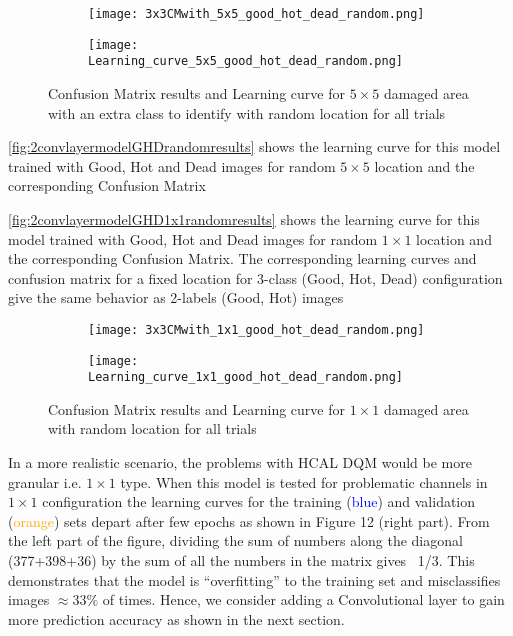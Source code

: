 \begin{figure}
	\begin{subfigure}{.5\textwidth}
 		\texttt{[image: 3x3CMwith\_5x5\_good\_hot\_dead\_random.png]}
 	\end{subfigure}
 	\begin{subfigure}{.45\textwidth}
 	\texttt{[image: Learning\_curve\_5x5\_good\_hot\_dead\_random.png]}
 	\end{subfigure}
 \caption{Confusion Matrix results and Learning curve
	 for $5\times5$ damaged area with an extra class to identify with random location for all trials\label{fig:2convlayermodelGHDrandomresults}}
 \end{figure}
 
\autoref{fig:2convlayermodelGHDrandomresults} shows the learning curve for this model trained with Good, Hot and Dead images for random $5\times5$ location and the corresponding Confusion Matrix

\autoref{fig:2convlayermodelGHD1x1randomresults} shows the learning curve for this model trained with Good, Hot and Dead images 
for random $1\times1 $ location and the corresponding Confusion Matrix. The corresponding learning curves and 
confusion matrix for a fixed location for 3-class (Good, Hot, Dead) configuration give the same behavior as 2-labels (Good, Hot) images



\begin{figure}
\begin{subfigure}{.5\textwidth}
\texttt{[image: 3x3CMwith\_1x1\_good\_hot\_dead\_random.png]}
\end{subfigure}
\begin{subfigure}{.45\textwidth}
\texttt{[image: Learning\_curve\_1x1\_good\_hot\_dead\_random.png]}
\end{subfigure}
\caption{Confusion Matrix results and Learning curve for $1\times1$ damaged area with random location for all trials
 \label{fig:2convlayermodelGHD1x1randomresults}}
\end{figure}
	
	
In a more realistic scenario, the problems with HCAL DQM would be more granular i.e. $1\times1$ type. 
When this model is tested for problematic channels in $1\times1$ configuration the learning curves for the training (\textcolor{blue}{blue}) and validation (\textcolor{orange}{orange}) sets depart after few epochs as shown in Figure 12 (right part).
From the left part of the figure, dividing the sum of numbers along the diagonal (377+398+36) by the sum of all the numbers in the matrix gives ~1/3. This demonstrates that the model is “overfitting” to the training set and misclassifies images $\approx 33\% $ of times. Hence, we consider adding a Convolutional layer to gain more prediction accuracy as shown in the next section.	
	

